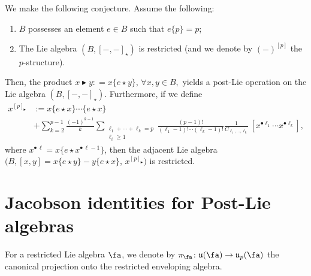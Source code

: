 \documentclass[12pt]{article}
\newcommand{\btr}{\blacktriangleright}
\begin{document}
We make the following conjecture.
 Assume the following: 
 \begin{enumerate}
 \item $B$ possesses an element $e \in B$ such that $e\{p\} = p$; 
 \item The Lie algebra $(B,[-,-]_{\star})$ is restricted (and we denote by $(-)^{[p]}$ the $p$-structure).
 \end{enumerate}
 Then, the product $x \btr y : = x\{e\star y\}$, $\forall x,y \in B,$ yields a post-Lie operation on the Lie algebra $(B,[-,-]_{\star})$.
 Furthermore, if we define  
\begin{align}
x^{[p]_{\btr}} &:= x\{e\star x\}\cdots \{e \star x\}\\ &+\sum_{k=2}^{p-1}\frac{(-1)^{k-1}}{k}\sum_{\substack{\ell_1 + \cdots + \ell_{k} = p \\ \ell_i \geq 1}} \frac{(p-1)!}{(\ell_1-1)!\cdots (\ell_k-1)!}\frac{1}{C_{\ell_1,\ldots,\ell_k}}\,[x^{\bullet\ell_1} \cdots x^{\bullet \ell_{k}}],
\end{align}
where $x^{\bullet\, \ell} = x\{e\star x^{\bullet\,\ell-1}\}$,
then the adjacent Lie algebra $\bigl(B, [x,y]=x\{e\star y\} - y\{e\star x\}$, $x^{[p]_{\btr}}\bigl)$  is restricted.



\section{Jacobson identities for Post-Lie algebras}
 For a restricted Lie algebra $\fa$, we denote by $\pi_{\fa}\colon \mathfrak{u}(\fa)\to\mathfrak{u}_p(\fa)$ the canonical projection onto the restricted enveloping algebra.
 
\end{document}
